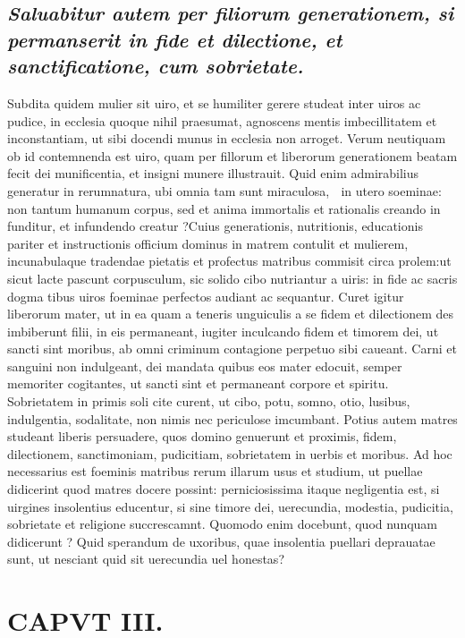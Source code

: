 \documentclass{article}
\begin{document}
\begin{pages}
\subsection*{\textit{Saluabitur autem per filiorum generationem, si permanserit in fide et dilectione, et sanctificatione, cum sobrietate. }}\pstart Subdita quidem mulier sit uiro, et se humiliter gerere studeat inter uiros ac pudice, in ecclesia quoque  nihil praesumat, agnoscens mentis imbecillitatem et inconstantiam, ut sibi docendi munus in ecclesia non arroget. Verum neutiquam ob id contemnenda est uiro, quam per fillorum et liberorum generationem beatam fecit dei munificentia, et insigni munere illustrauit. Quid enim admirabilius generatur in rerumnatura, ubi omnia tam sunt miraculosa,  in utero soeminae: non tantum humanum corpus, sed et anima immortalis et rationalis creando in funditur, et infundendo creatur ?Cuius generationis, nutritionis, educationis pariter et instructionis officium dominus in matrem contulit et mulierem, incunabulaque  tradendae pietatis et profectus matribus commisit circa prolem:ut sicut lacte pascunt corpusculum, sic solido cibo nutriantur a uiris: in fide ac sacris dogma tibus uiros foeminae perfectos audiant ac sequantur. Curet igitur liberorum mater, ut in ea quam a teneris unguiculis a se fidem et dilectionem des imbiberunt filii, in eis permaneant, iugiter inculcando fidem et timorem dei, ut sancti sint moribus, ab omni criminum contagione perpetuo sibi caueant. Carni et sanguini non indulgeant, dei mandata quibus eos mater edocuit, semper memoriter cogitantes, ut sancti sint et permaneant corpore et spiritu. Sobrietatem in primis soli cite curent, ut cibo, potu, somno, otio, lusibus, indulgentia, sodalitate, non nimis nec periculose imcumbant. Potius autem matres studeant liberis persuadere, quos domino genuerunt et proximis, fidem, dilectionem, sanctimoniam, pudicitiam, sobrietatem in uerbis et moribus. Ad hoc necessarius est foeminis matribus rerum illarum usus et studium, ut puellae didicerint quod matres docere possint: perniciosissima itaque  negligentia est, si uirgines insolentius educentur, si sine timore dei, uerecundia, modestia, pudicitia, sobrietate et religione succrescamnt. Quomodo enim docebunt, quod nunquam didicerunt ? Quid sperandum de uxoribus, quae insolentia puellari deprauatae sunt, ut nesciant quid sit uerecundia uel honestas?  \pend
\endnumbering\beginnumbering\section{CAPVT III.}
{}

\end{pages}
\end{document}
